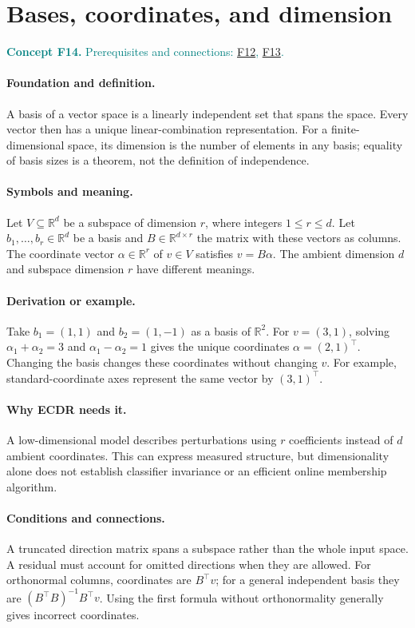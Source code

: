 \documentclass[11pt,a4paper]{article}
\newcommand{\R}{\mathbb R}
\newcommand{\conceptid}{Front matter}
\newcommand{\concept}[3]{\clearpage\renewcommand{\conceptid}{#1}%
\section{#2}\label{concept:#1}%
\textcolor{teal}{\textbf{Concept #1.} Prerequisites and connections: #3.}\par
\typeout{ECDR-CONCEPT-START #1 PAGE=\thepage}}
\begin{document}
\concept{F14}{Bases, coordinates, and dimension}{\hyperref[concept:F12]{F12}, \hyperref[concept:F13]{F13}}
\paragraph{Foundation and definition.}
A basis of a vector space is a linearly independent set that spans the
space. Every vector then has a unique linear-combination representation.
For a finite-dimensional space, its dimension is the number of elements
in any basis; equality of basis sizes is a theorem, not the definition
of independence.
\paragraph{Symbols and meaning.}
Let $V\subseteq\R^d$ be a subspace of dimension $r$, where integers
$1\le r\le d$. Let $b_1,\ldots,b_r\in\R^d$ be a basis and
$B\in\R^{d\times r}$ the matrix with these vectors as columns.
The coordinate vector $\alpha\in\R^r$ of $v\in V$ satisfies
$v=B\alpha$. The ambient dimension $d$ and subspace dimension $r$ have
different meanings.
\paragraph{Derivation or example.}
Take $b_1=(1,1)$ and $b_2=(1,-1)$ as a basis of $\R^2$.
For $v=(3,1)$, solving
$\alpha_1+\alpha_2=3$ and $\alpha_1-\alpha_2=1$ gives the unique
coordinates $\alpha=(2,1)^\top$. Changing the basis changes these
coordinates without changing $v$. For example, standard-coordinate
axes represent the same vector by $(3,1)^\top$.
\paragraph{Why ECDR needs it.}
A low-dimensional model describes perturbations using $r$ coefficients
instead of $d$ ambient coordinates. This can express measured structure,
but dimensionality alone does not establish classifier invariance or
an efficient online membership algorithm.
\paragraph{Conditions and connections.}
A truncated direction matrix spans a subspace rather than the whole
input space. A residual must account for omitted directions when they
are allowed. For orthonormal columns, coordinates are $B^\top v$;
for a general independent basis they are
$(B^\top B)^{-1}B^\top v$. Using the first formula without
orthonormality generally gives incorrect coordinates.
\par\label{endconcept:F14}
\end{document}
